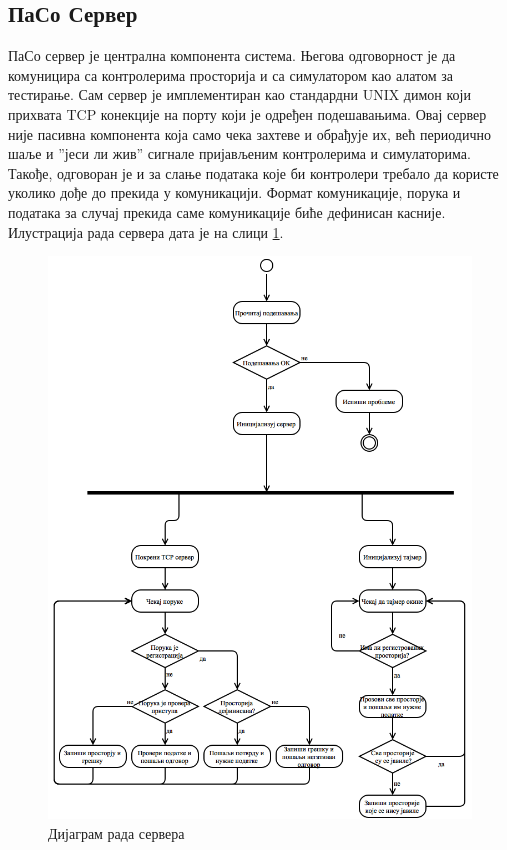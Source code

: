 \documentclass[a4paper, 12pt, diplomski]{etfcyr}
\begin{document}
			\subsection{ПаСо Сервер}
				\begin{justify}
					ПаСо сервер је централна компонента система. Његова одговорност је да комуницира са контролерима просторија и са симулатором као алатом за тестирање. Сам сервер је имплементиран као стандардни UNIX димон који прихвата TCP конекције на порту који је одређен подешавањима. Овај сервер није пасивна компонента која само чека захтеве и обрађује их, већ периодично шаље и ”јеси ли жив” сигнале пријављеним контролерима и симулаторима. Такође, одговоран је и за слање података које би контролери требало да користе уколико дође до прекида у комуникацији. Формат комуникације, порука и података за случај прекида саме комуникације биће дефинисан касније.
					Илустрација рада сервера дата је на слици \ref{figure:3}.
					\begin{figure}[h]
						\begin{center}
							\includegraphics[scale=0.35]{ServerWorkflow.png}
						\end{center}
						\caption{Дијаграм рада сервера}
						\label{figure:3}
					\end{figure}
				\end{justify}
\end{document}
